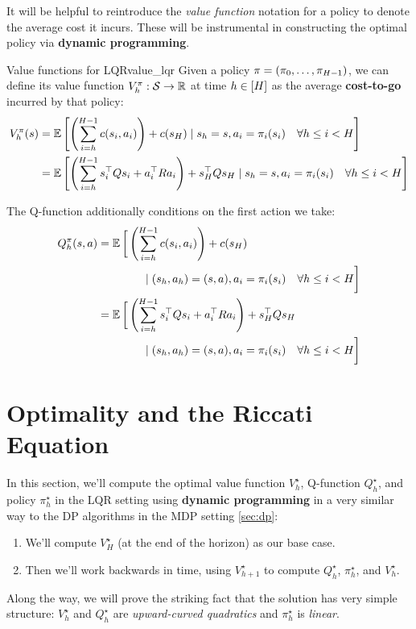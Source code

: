 \documentclass[\main/main]{subfiles}
\begin{document}
It will be helpful to reintroduce the \emph{value function} notation for a policy to denote the average cost it incurs.
These will be instrumental in constructing the optimal policy via \textbf{dynamic programming}.

\begin{definition}{Value functions for LQR}{value_lqr}
    Given a policy $\mathbf{\pi} = (\pi_0, \dots, \pi_{H-1})$, we can define its
    value function $V^\pi_h : \mathcal{S} \to \mathbb{R}$ at time $h \in [H]$ as the average \textbf{cost-to-go} incurred by that policy:
    \[
        \begin{split}
            V^\pi_h (s) &= \operatorname*{\mathbb{E}} \left[ \left( \sum_{i=h}^{H-1} c(s_i, a_i) \right) + c(s_H) \mid s_h = s,  a_i = \pi_i(s_i) \quad \forall h \le i < H \right] \\
            &= \operatorname*{\mathbb{E}} \left[ \left( \sum_{i=h}^{H-1} s_i^\top Q s_i + a_i^\top R a_i \right) + s_H^\top Q s_H \mid s_h = s, a_i = \pi_i(s_i) \quad \forall h \le i < H \right] \\
        \end{split}
    \]

    The Q-function additionally conditions on the first
    action we take:
    \[
        \begin{split}
            Q^\pi_h (s, a) &= \operatorname*{\mathbb{E}} \bigg[ \left( \sum_{i=h}^{H-1} c(s_i, a_i) \right) + c(s_H) \\
                &\qquad\qquad \mid  (s_h, a_h) = (s, a), a_i = \pi_i(s_i) \quad \forall h \le i < H \bigg] \\
            &= \operatorname*{\mathbb{E}} \bigg[ \left( \sum_{i=h}^{H-1} s_i^\top Q s_i + a_i^\top R a_i \right) + s_H^\top Q s_H \\
                &\qquad\qquad \mid (s_h, a_h) = (s, a), a_i = \pi_i(s_i) \quad \forall h \le i < H \bigg] \\
        \end{split}
    \]
\end{definition}


\section{Optimality and the Riccati Equation} \label{sec:optimal_lqr}

In this section, we'll compute the optimal value function $V^\star_h$, Q-function $Q^\star_h$, and policy $\pi^\star_h$ in the LQR setting using \textbf{dynamic programming} in a very similar way to the DP algorithms in the MDP setting \eqref{sec:dp}:
\begin{enumerate}
    \item We'll compute $V_H^\star$ (at the end of the horizon) as our base case.
    \item Then we'll work backwards in time, using $V_{h+1}^\star$ to compute $Q_h^\star$, $\pi_{h}^\star$, and $V_h^\star$.
\end{enumerate}
Along the way, we will prove the striking fact that the solution has very simple structure: $V_h^\star$ and $Q^\star_h$ are \emph{upward-curved quadratics} and $\pi_h^\star$ is \emph{linear}.
\end{document}
